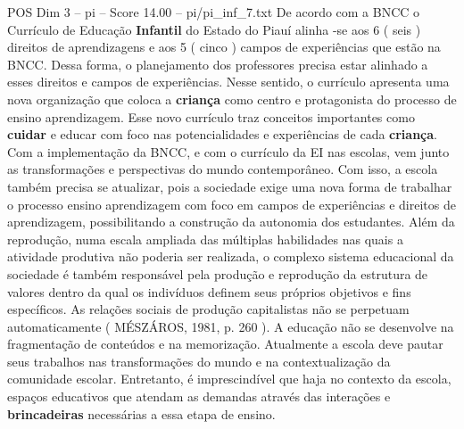 \begin{textsample}{POS Dim 3 – pi – Score 14.00 – pi/pi\_inf\_7.txt}
De acordo com a BNCC o Currículo de Educação \textbf{Infantil} do Estado do Piauí alinha -se aos 6 ( seis ) direitos de aprendizagens e aos 5 ( cinco ) campos de experiências que estão na BNCC.
Dessa forma, o planejamento dos professores precisa estar alinhado a esses direitos e campos de experiências.
Nesse sentido, o currículo apresenta uma nova organização que coloca a \textbf{criança} como centro e protagonista do processo de ensino aprendizagem.
Esse novo currículo traz conceitos importantes como \textbf{cuidar} e educar com foco nas potencialidades e experiências de cada \textbf{criança}.
Com a implementação da BNCC, e com o currículo da EI nas escolas, vem junto as transformações e perspectivas do mundo contemporâneo.
Com isso, a escola também precisa se atualizar, pois a sociedade exige uma nova forma de trabalhar o processo ensino aprendizagem com foco em campos de experiências e direitos de aprendizagem, possibilitando a construção da autonomia dos estudantes.
Além da reprodução, numa escala ampliada das múltiplas habilidades nas quais a atividade produtiva não poderia ser realizada, o complexo sistema educacional da sociedade é também responsável pela produção e reprodução da estrutura de valores dentro da qual os indivíduos definem seus próprios objetivos e fins específicos.
As relações sociais de produção capitalistas não se perpetuam automaticamente ( MÉSZÁROS, 1981, p. 260 ).
A educação não se desenvolve na fragmentação de conteúdos e na memorização.
Atualmente a escola deve pautar seus trabalhos nas transformações do mundo e na contextualização da comunidade escolar.
Entretanto, é imprescindível que haja no contexto da escola, espaços educativos que atendam as demandas através das interações e \textbf{brincadeiras} necessárias a essa etapa de ensino.

\end{textsample}
